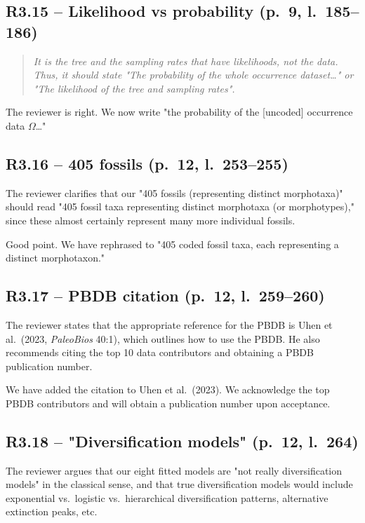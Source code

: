 \documentclass[11pt]{article}
\newenvironment{RC}{\begin{quote}\itshape}{\end{quote}}
\newcommand{\response}[1]{\noindent\textcolor{resp}{#1}\medskip}
\begin{document}
\subsection*{R3.15 -- Likelihood vs probability (p.\ 9, l.\ 185--186)}

\begin{RC}
It is the tree and the sampling rates that have likelihoods, not the data. Thus, it should state "The probability of the whole occurrence dataset\ldots" or "The likelihood of the tree and sampling rates".
\end{RC}

\response{The reviewer is right. We now write "the probability of the [uncoded] occurrence data $\Omega$\ldots"}

\subsection*{R3.16 -- 405 fossils (p.\ 12, l.\ 253--255)}

The reviewer clarifies that our "405 fossils (representing distinct morphotaxa)" should read "405 fossil taxa representing distinct morphotaxa (or morphotypes)," since these almost certainly represent many more individual fossils.

\response{Good point. We have rephrased to "405 coded fossil taxa, each representing a distinct morphotaxon."}

\subsection*{R3.17 -- PBDB citation (p.\ 12, l.\ 259--260)}

The reviewer states that the appropriate reference for the PBDB is Uhen et al.\ (2023, \textit{PaleoBios} 40:1), which outlines how to use the PBDB. He also recommends citing the top 10 data contributors and obtaining a PBDB publication number.

\response{We have added the citation to Uhen et al.\ (2023). We acknowledge the top PBDB contributors and will obtain a publication number upon acceptance.}

\subsection*{R3.18 -- "Diversification models" (p.\ 12, l.\ 264)}

The reviewer argues that our eight fitted models are "not really diversification models" in the classical sense, and that true diversification models would include exponential vs.\ logistic vs.\ hierarchical diversification patterns, alternative extinction peaks, etc.
\end{document}
